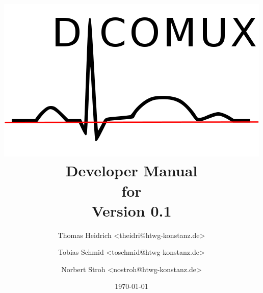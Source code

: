 %
%

\begin{titlepage}
\title{
	\centering
	\includegraphics[scale=0.8]{screens/logo_big.png}
	\medskip
	Developer Manual\\
	for\\
	Version 0.1
}

\author {
Thomas Heidrich <theidri@htwg-konstanz.de> \and
Tobias Schmid <toschmid@htwg-konstanz.de> \and
Norbert Stroh <nostroh@htwg-konstanz.de>
}
\date{\today}
\maketitle
\end{titlepage}

%
%
